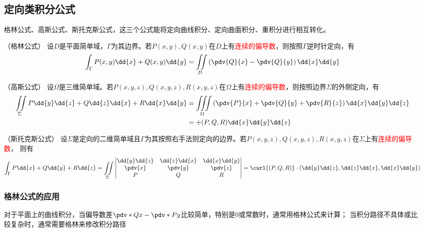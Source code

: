 \subsection{定向类积分公式}
格林公式、高斯公式、斯托克斯公式，这三个公式能将定向曲线积分、定向曲面积分、重积分进行相互转化。
\begin{theorem}
    （格林公式）
    \label{th:格林公式}
    设$D$是平面简单域，$\Gamma$为其边界。若$P(x,y),Q(x,y)$在$D$上有\textcolor{red}{连续的偏导数}，则按照$\Gamma$逆时针定向，有
    \[ \int_\Gamma P(x,y)\dd{x} + Q(x,y)\dd{y} = \iint\limits_D \left(\pdv{Q}{x} - \pdv{Q}{y}\right) \dd{x}\dd{y} \]
\end{theorem}
\begin{theorem}
    （高斯公式）
    \label{th:高斯公式}
    设$\Omega$是三维简单域。若$P(x,y,z),Q(x,y,z),R(x,y,z)$在$\Omega$上有\textcolor{red}{连续的偏导数}，则按照边界$\Sigma$的外侧定向，有
    \begin{align*}
        \iint\limits_\Sigma P\dd{y}\dd{z} + Q\dd{z}\dd{x} + R\dd{x}\dd{y}
         & =\iiint\limits_\Omega \left(\pdv{P}{x} + \pdv{Q}{y} + \pdv{R}{z}\right) \dd{x}\dd{y}\dd{z} \\
         & =\div{(P,Q,R)}\dd{x}\dd{y}\dd{z}
    \end{align*}
\end{theorem}
\begin{theorem}
    （斯托克斯公式）
    设$\Sigma$是定向的二维简单域且$\Gamma$为其按照右手法则定向的边界。若$P(x,y,z),Q(x,y,z),R(x,y,z)$在$\Sigma$上有\textcolor{red}{连续的偏导数}，
    则有
    \[
        \int_\Gamma P\dd{x} + Q\dd{y} + R\dd{z}
        =
        \iint\limits_\Sigma
        \begin{vmatrix}
            \dd{y}\dd{z} & \dd{z}\dd{x} & \dd{x}\dd{y} \\
            \pdv{x}      & \pdv{y}      & \pdv{z}      \\
            P            & Q            & R
        \end{vmatrix}
        =\curl{(P,Q,R)}\cdot(\dd{y}\dd{z},\dd{z}\dd{x},\dd{x}\dd{y})
    \]
\end{theorem}

\subsubsection{格林公式的应用}
对于平面上的曲线积分，当偏导数差$\pdv*{Q}{x}-\pdv*{P}{y}$比较简单，特别是$0$或常数时，通常用格林公式来计算；
当积分路径不具体或比较复杂时，通常需要格林来修改积分路径

